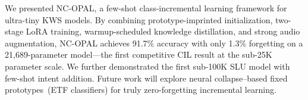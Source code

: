 \documentclass{Interspeech}
\begin{document}
We presented NC-OPAL, a few-shot class-incremental learning framework for ultra-tiny KWS models.
By combining prototype-imprinted initialization, two-stage LoRA training, warmup-scheduled knowledge distillation, and strong audio augmentation, NC-OPAL achieves 91.7\% accuracy with only 1.3\% forgetting on a 21,689-parameter model---the first competitive CIL result at the sub-25K parameter scale.
We further demonstrated the first sub-100K SLU model with few-shot intent addition.
Future work will explore neural collapse--based fixed prototypes~(ETF classifiers) for truly zero-forgetting incremental learning.



\end{document}

